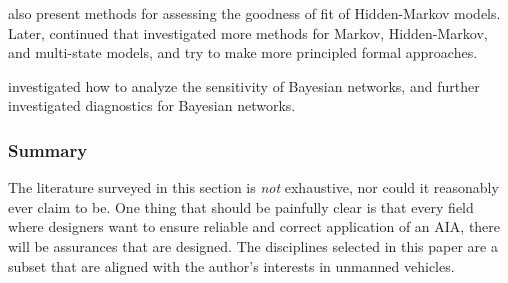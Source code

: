     \cite{MacKay_Altman2004-fl} also present methods for assessing the goodness of fit of Hidden-Markov models. Later, \citet{Titman2008-ct,Titman2012-zw,Titman2010-qx} continued that investigated more methods for Markov, Hidden-Markov, and multi-state models, and try to make more principled formal approaches.

    
    \citet{Laskey1995-jp} investigated how to analyze the sensitivity of Bayesian networks, and \citet{Sinharay2006-yc} further investigated diagnostics for Bayesian networks.

\subsubsection{Summary}
    The literature surveyed in this section is \emph{not} exhaustive, nor could it reasonably ever claim to be. One thing that should be painfully clear is that every field where designers want to ensure reliable and correct application of an AIA, there will be assurances that are designed. The disciplines selected in this paper are a subset that are aligned with the author's interests in unmanned vehicles.

%

